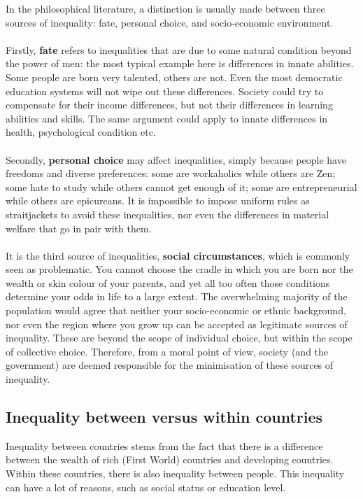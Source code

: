 \documentclass[../summary.tex]{subfiles}
\begin{document}
In the philosophical literature, a distinction is usually made between three sources of inequality: fate, personal choice, and socio-economic environment.
\\\\
Firstly, \textbf{fate} refers to inequalities that are due to some natural condition beyond the power of men: the most typical example here is differences in innate abilities. Some people are born very talented, others are not. Even the most democratic education systems will not wipe out these differences. Society could try to compensate for their income differences, but not their differences in learning abilities and skills. The same argument could apply to innate differences in health, psychological condition etc.
\\\\
Secondly, \textbf{personal choice} may affect inequalities, simply because people have freedoms and diverse preferences: some are workaholics while others are Zen; some hate to study while others cannot get enough of it; some are entrepreneurial while others are epicureans. It is impossible to impose uniform rules as straitjackets to avoid these inequalities, nor even the differences in material welfare that go in pair with them.
\\\\
It is the third source of inequalities, \textbf{social circumstances}, which is commonly seen as problematic. You cannot choose the cradle in which you are born nor the wealth or skin colour of your parents, and yet all too often those conditions determine your odds in life to a large extent. The overwhelming majority of the population would agree that neither your socio-economic or ethnic background, nor even the region where you grow up can be accepted as legitimate sources of inequality. These are beyond the scope of individual choice, but within the scope of collective choice. Therefore, from a moral point of view, society (and the government) are deemed responsible for the minimisation of these sources of inequality.

\subsection{Inequality between versus within countries}

Inequality between countries stems from the fact that there is a difference between the wealth of rich (First World) countries and developing countries. Within these countries, there is also inequality between people. This inequality can have a lot of reasons, such as social status or education level.
\end{document}
